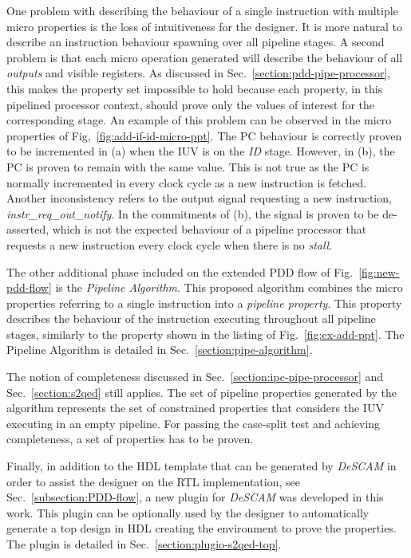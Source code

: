 One problem with describing the behaviour of a single instruction with multiple micro properties is the loss of intuitiveness for the designer. It is more natural to describe an instruction behaviour spawning over all pipeline stages. A second problem is that each micro operation generated will describe the behaviour of all \textit{outputs} and visible registers. As discussed in Sec.~\ref{section:pdd-pipe-processor}, this makes the property set impossible to hold because each property, in this pipelined processor context, should prove only the values of interest for the corresponding stage. An example of this problem can be observed in the micro properties of Fig,~\ref{fig:add-if-id-micro-ppt}. The PC behaviour is correctly proven to be incremented in (a) when the IUV is on the \textit{ID} stage. However, in (b), the PC is proven to remain with the same value. This is not true as the PC is normally incremented in every clock cycle as a new instruction is fetched. Another inconsistency refers to the output signal requesting a new instruction, \textit{instr\_req\_out\_notify}. In the  commitments of (b), the signal is proven to be de-asserted, which is not the expected behaviour of a pipeline processor that requests a new instruction every clock cycle when there is no \textit{stall}.

The other additional phase included on the extended PDD flow of Fig.~\ref{fig:new-pdd-flow} is the \textit{Pipeline Algorithm}. This proposed algorithm combines the micro properties referring to a single instruction into a \textit{pipeline property}. This property describes the behaviour of the instruction executing throughout all pipeline stages, similarly to the property shown in the listing of Fig.~\ref{fig:ex-add-ppt}. The Pipeline Algorithm is detailed in Sec.~\ref{section:pipe-algorithm}.

The notion of completeness discussed in Sec.~\ref{section:ipc-pipe-processor} and Sec.~\ref{section:s2qed} still applies. The set of pipeline properties generated by the algorithm represents the set of constrained properties that considers the IUV executing in an empty pipeline. For passing the case-split test and achieving completeness, a set of \SSQED{} properties has to be proven.

Finally, in addition to the HDL template that can be generated by \textit{DeSCAM} in order to assist the designer on the RTL implementation, see Sec.~\ref{subsection:PDD-flow}, a new plugin  for \textit{DeSCAM} was developed in this work. This plugin can be optionally used by the designer to automatically generate a top design in HDL creating the environment to prove the \SSQED{} properties. The plugin is detailed in Sec.~\ref{section:plugio-s2qed-top}.

